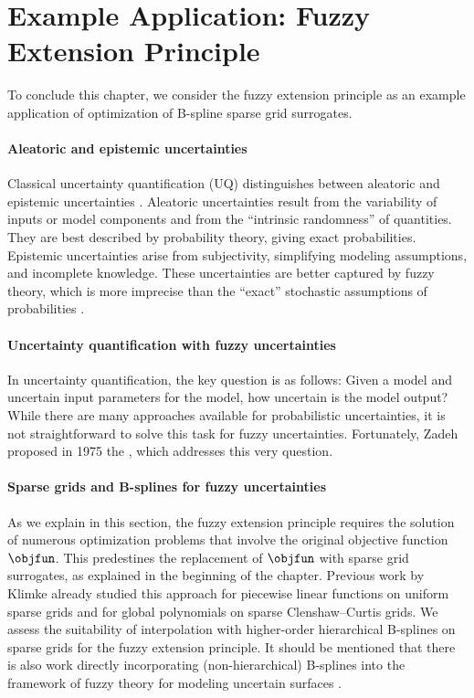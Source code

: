 \section{Example Application: Fuzzy Extension Principle}
\label{sec:55fuzzy}


\noindent
To conclude this chapter, we consider the fuzzy extension principle
as an example application of optimization of B-spline sparse grid surrogates.

\paragraph{Aleatoric and epistemic uncertainties}

Classical uncertainty quantification (UQ) distinguishes between
aleatoric and epistemic uncertainties \cite{Walz16Fuzzy}.
Aleatoric uncertainties result from the variability of inputs or
model components and from the ``intrinsic randomness''
of quantities.
They are best described by probability theory, giving exact probabilities.
Epistemic uncertainties arise from subjectivity,
simplifying modeling assumptions, and incomplete knowledge.
These uncertainties are better captured by fuzzy theory,
which is more imprecise than the ``exact'' stochastic assumptions
of probabilities \cite{Walz16Fuzzy}.

\paragraph{Uncertainty quantification with fuzzy uncertainties}

In uncertainty quantification, the key question is as follows:
Given a model and uncertain input parameters for the model,
how uncertain is the model output?
While there are many approaches available
for probabilistic uncertainties,
it is not straightforward to solve this task
for fuzzy uncertainties.
Fortunately, Zadeh proposed in 1975
the  \cite{Zadeh75Concept},
which addresses this very question.

\paragraph{Sparse grids and B-splines for fuzzy uncertainties}

As we explain in this section,
the fuzzy extension principle requires the solution of numerous
optimization problems that involve the original objective function
$\objfun$.
This predestines the replacement of $\objfun$ with sparse grid surrogates,
as explained in the beginning of the chapter.
Previous work by Klimke \cite{Klimke06Uncertainty} already
studied this approach for piecewise linear functions on uniform sparse grids
and for global polynomials on sparse Clenshaw--Curtis grids.
We assess the suitability of interpolation with higher-order
hierarchical B-splines on sparse grids for the fuzzy extension principle.
It should be mentioned that there is also work
directly incorporating (non-hierarchical) B-splines
into the framework of fuzzy theory for modeling uncertain surfaces
.



